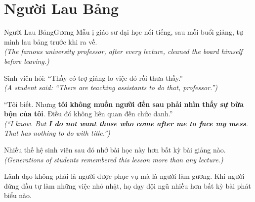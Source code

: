 \section{Người Lau Bảng}
\begin{truyen}{Người Lau Bảng}{Gương Mẫu}
ị giáo sư đại học nổi tiếng, sau mỗi buổi giảng, tự mình lau bảng trước khi ra về.\\
\textit{(The famous university professor, after every lecture, cleaned the board himself before leaving.)}

Sinh viên hỏi: ``Thầy có trợ giảng lo việc đó rồi thưa thầy.''\\
\textit{(A student said: ``There are teaching assistants to do that, professor.'')}

``Tôi biết. Nhưng \textbf{tôi không muốn người đến sau phải nhìn thấy sự bừa bộn của tôi}. Điều đó không liên quan đến chức danh.''\\
\textit{(``I know. But \textbf{I do not want those who come after me to face my mess}. That has nothing to do with title.'')}

Nhiều thế hệ sinh viên sau đó nhớ bài học này hơn bất kỳ bài giảng nào.\\
\textit{(Generations of students remembered this lesson more than any lecture.)}
\end{truyen}
\begin{baihoc}
  Lãnh đạo không phải là người được phục vụ mà là người làm gương. Khi người đứng đầu tự làm những việc nhỏ nhặt, họ dạy đội ngũ nhiều hơn bất kỳ bài phát biểu nào.
\end{baihoc}

